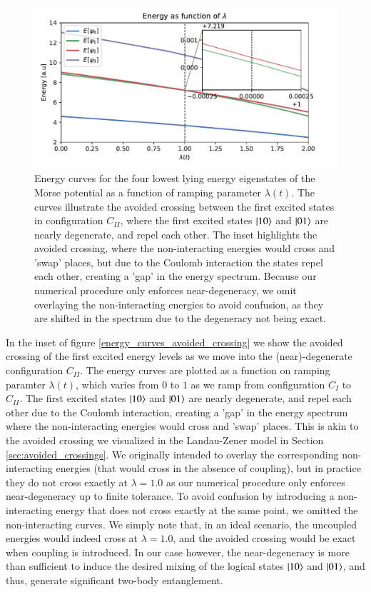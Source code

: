 \documentclass{subfiles}
\begin{document}
\begin{figure}
  \centering
  \includegraphics[width=1.0\textwidth]{figs/energy_curves_avoided_crossing.pdf}
  \caption{Energy curves for the four lowest lying energy eigenstates of the Morse potential as a function of ramping parameter $\lambda(t)$. The curves illustrate the avoided crossing between the first excited states in configuration $C_{II}$, where the first excited states $\ket{10}$ and $\ket{01}$ are nearly degenerate, and repel each other. The inset highlights the avoided crossing, where the non-interacting energies would cross and 'swap' places, but due to the Coulomb interaction the states repel each other, creating a 'gap' in the energy spectrum. Because our numerical procedure only enforces near-degeneracy, we omit overlaying the non-interacting energies to avoid confusion, as they are shifted in the spectrum due to the degeneracy not being exact. }
  \label{fig:energy_curves_avoided_crossing}
\end{figure}
In the inset of figure \ref{energy_curves_avoided_crossing} we show the avoided crossing of the first excited energy levels as we move into the (near)-degenerate configuration $C_{II}$. The energy curves are plotted as a function on ramping paramter $\lambda(t)$, which varies from $0$ to $1$ as we ramp from configuration $C_I$ to $C_{II}$. The first excited states $\ket{10}$ and $\ket{01}$ are nearly degenerate, and repel each other due to the Coulomb interaction, creating a 'gap' in the energy spectrum where the non-interacting energies would cross and 'swap' places. This is akin to the avoided crossing we visualized in the Landau-Zener model in Section \ref{sec:avoided_crossings}. We originally intended to overlay the corresponding non-interacting energies (that would cross in the absence of coupling), but in practice they do not cross exactly at $\lambda = 1.0$ as our numerical procedure only enforces near-degeneracy up to finite tolerance. To avoid confusion by introducing a non-interacting energy that does not cross exactly at the same point, we omitted the non-interacting curves. We simply note that, in an ideal scenario, the uncoupled energies would indeed cross at $\lambda = 1.0$, and the avoided crossing would be exact when coupling is introduced. In our case however, the near-degeneracy is more than sufficient to induce the desired mixing of the logical states $\ket{10}$ and $\ket{01}$, and thus, generate significant two-body entanglement.
\\
\end{document}
